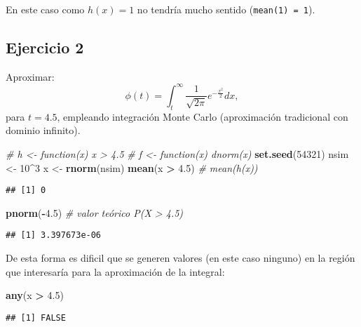 \documentclass[
]{book}
\newenvironment{Shaded}{\begin{snugshade}}{\end{snugshade}}
\newcommand{\CommentTok}[1]{\textcolor[rgb]{0.56,0.35,0.01}{\textit{#1}}}
\newcommand{\DecValTok}[1]{\textcolor[rgb]{0.00,0.00,0.81}{#1}}
\newcommand{\FloatTok}[1]{\textcolor[rgb]{0.00,0.00,0.81}{#1}}
\newcommand{\KeywordTok}[1]{\textcolor[rgb]{0.13,0.29,0.53}{\textbf{#1}}}
\newcommand{\NormalTok}[1]{#1}
\newcommand{\OperatorTok}[1]{\textcolor[rgb]{0.81,0.36,0.00}{\textbf{#1}}}
\newcommand{\StringTok}[1]{\textcolor[rgb]{0.31,0.60,0.02}{#1}}
\theoremstyle{break}
\theoremstyle{definition}
\theoremstyle{definition}
\theoremstyle{definition}
\theoremstyle{remark}
\begin{document}
En este caso como \(h(x) = 1\) no tendría mucho sentido (\texttt{mean(1)\ =\ 1}).

\hypertarget{ejercicio-2}{%
\subsection{Ejercicio 2}\label{ejercicio-2}}

Aproximar:
\[\phi(t)=\int_{t}^{\infty}\frac{1}{\sqrt{2\pi}}e^{-\frac{x^{2}}{2}}dx,\]
para \(t=4.5\), empleando integración Monte Carlo (aproximación tradicional con dominio infinito).

\begin{Shaded}
\begin{Highlighting}[]
\CommentTok{# h <- function(x) x > 4.5}
\CommentTok{# f <- function(x) dnorm(x)}
\KeywordTok{set.seed}\NormalTok{(}\DecValTok{54321}\NormalTok{)}
\NormalTok{nsim <-}\StringTok{ }\DecValTok{10}\OperatorTok{^}\DecValTok{3}
\NormalTok{x <-}\StringTok{ }\KeywordTok{rnorm}\NormalTok{(nsim)}
\KeywordTok{mean}\NormalTok{(x }\OperatorTok{>}\StringTok{ }\FloatTok{4.5}\NormalTok{) }\CommentTok{# mean(h(x))}
\end{Highlighting}
\end{Shaded}

\begin{verbatim}
## [1] 0
\end{verbatim}

\begin{Shaded}
\begin{Highlighting}[]
\KeywordTok{pnorm}\NormalTok{(}\OperatorTok{-}\FloatTok{4.5}\NormalTok{)  }\CommentTok{# valor teórico P(X > 4.5) }
\end{Highlighting}
\end{Shaded}

\begin{verbatim}
## [1] 3.397673e-06
\end{verbatim}

De esta forma es dificil que se generen valores (en este caso ninguno)
en la región que interesaría para la aproximación de la integral:

\begin{Shaded}
\begin{Highlighting}[]
\KeywordTok{any}\NormalTok{(x }\OperatorTok{>}\StringTok{ }\FloatTok{4.5}\NormalTok{)}
\end{Highlighting}
\end{Shaded}

\begin{verbatim}
## [1] FALSE
\end{verbatim}
\end{document}
